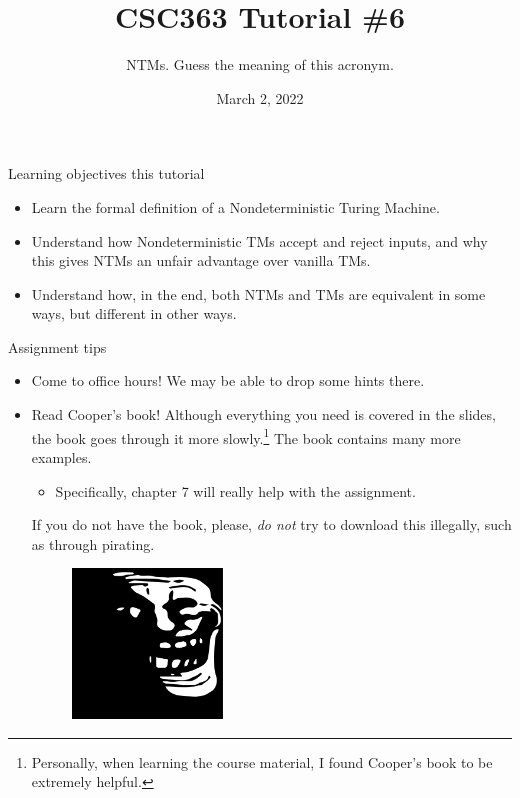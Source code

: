 \documentclass{beamer}
\title{CSC363 Tutorial \#6}
\subtitle{NTMs. \tiny Guess the meaning of this acronym.}
\date{March 2, 2022}
\institute{}
\begin{document}
\maketitle

\begin{frame}{Learning objectives this tutorial}
\begin{itemize}
\item Learn the formal definition of a Nondeterministic Turing Machine.
\item Understand how Nondeterministic TMs accept and reject inputs, and why this gives NTMs an unfair advantage over vanilla TMs.
\item Understand how, in the end, both NTMs and TMs are equivalent in some ways, but different in other ways.
\end{itemize}
\end{frame}

\begin{frame}{Assignment tips}
\begin{itemize}
\item Come to office hours! We may be able to drop some hints there.
\item Read Cooper's book! Although everything you need is covered in the slides, the book goes through it more slowly.\footnote{Personally, when learning the course material, I found Cooper's book to be extremely helpful.} The book contains many more examples.
\begin{itemize}
    \item Specifically, chapter 7 will really help with the assignment.
\end{itemize}
If you do not have the book, please, \textit{do not} try to download this illegally, such as through pirating.
\begin{figure}[h]
    \centering
    \includegraphics[width=4cm]{img/trollge.png}
\end{figure}
\end{itemize}
\end{frame}
\end{document}
